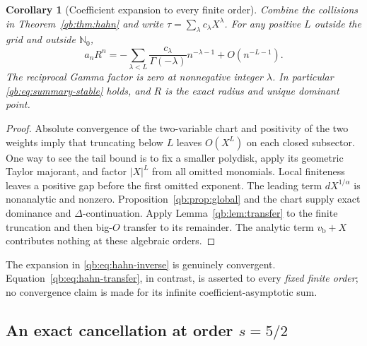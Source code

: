 \documentclass[11pt,a4paper]{article}
\newtheorem{corollary}[theorem]{Corollary}
\theoremstyle{definition}\newtheorem{definition}[theorem]{Definition}
\theoremstyle{remark}\newtheorem{remark}[theorem]{Remark}
\newcommand{\N}{\mathbb N}
\newcommand{\vb}{v_{\mathrm b}}
\numberwithin{equation}{section}
\begin{document}
\begin{corollary}[Coefficient expansion to every finite order]
\label{qb:cor:hahn-transfer}
Combine the collisions in Theorem~\ref{qb:thm:hahn} and write
$\tau=\sum_\lambda c_\lambda X^\lambda$. For any positive $L$ outside
the grid and outside $\N_0$,
\begin{equation}\label{qb:eq:hahn-transfer}
 a_nR^n=-\sum_{\lambda<L}
 \frac{c_\lambda}{\Gamma(-\lambda)}n^{-\lambda-1}
 +O(n^{-L-1}).
\end{equation}
The reciprocal Gamma factor is zero at nonnegative integer $\lambda$.
In particular \eqref{qb:eq:summary-stable} holds, and $R$ is the exact
radius and unique dominant point.
\end{corollary}
\begin{proof}
Absolute convergence of the two-variable chart and positivity of the two
weights imply that truncating below $L$ leaves $O(X^L)$ on each closed
subsector. One way to see the tail bound is to fix a smaller polydisk,
apply its geometric Taylor majorant, and factor $|X|^L$ from all omitted
monomials. Local finiteness leaves a positive gap before the first omitted
exponent. The leading term $dX^{1/\alpha}$ is nonanalytic and nonzero.
Proposition~\ref{qb:prop:global} and the chart supply exact dominance and
$\Delta$-continuation. Apply Lemma~\ref{qb:lem:transfer} to the finite
truncation and then big-$O$ transfer to its remainder. The analytic term
$\vb+X$ contributes nothing at these algebraic orders.
\end{proof}

The expansion in \eqref{qb:eq:hahn-inverse} is genuinely convergent.
Equation~\eqref{qb:eq:hahn-transfer}, in contrast, is asserted to every
\emph{fixed finite order}; no convergence claim is made for its infinite
coefficient-asymptotic sum.

\subsection{An exact cancellation at order \texorpdfstring{$s=5/2$}{5/2}}
\end{document}
